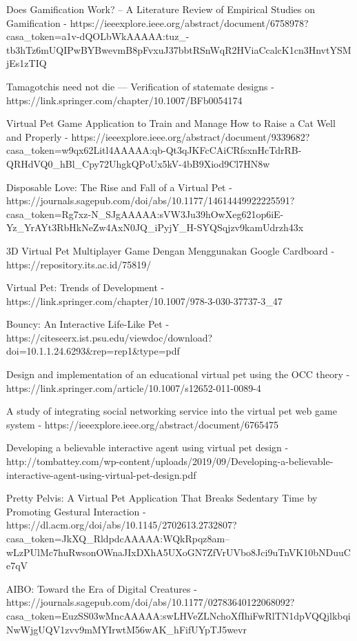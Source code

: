 Does Gamification Work? -- A Literature Review of Empirical Studies on Gamification - https://ieeexplore.ieee.org/abstract/document/6758978?casa_token=a1v-dQOLbWkAAAAA:tuz_-tb3hTz6mUQIPwBYBwevmB8pFvxuJ37bbtRSnWqR2HViaCcalcK1cn3HnvtYSMjEs1zTIQ



Tamagotchis need not die — Verification of statemate designs - https://link.springer.com/chapter/10.1007/BFb0054174


Virtual Pet Game Application to Train and Manage How to Raise a Cat Well and Properly - https://ieeexplore.ieee.org/abstract/document/9339682?casa_token=w9qx62Litl4AAAAA:qb-Qt3qJKFcCAiCRfsxnHcTdrRB-QRHdVQ0_hBl_Cpy72UhgkQPoUx5kV-4bB9Xiod9Cl7HN8w

Disposable Love: The Rise and Fall of a Virtual Pet - https://journals.sagepub.com/doi/abs/10.1177/14614449922225591?casa_token=Rg7xz-N_SJgAAAAA:sVW3Ju39hOwXeg621op6iE-Yz_YrAYt3RbHkNeZw4AxN0JQ_iPyjY_H-SYQSqjzv9kamUdrzh43x

3D Virtual Pet Multiplayer Game Dengan Menggunakan Google Cardboard - https://repository.its.ac.id/75819/

Virtual Pet: Trends of Development - https://link.springer.com/chapter/10.1007/978-3-030-37737-3_47

Bouncy: An Interactive Life-Like Pet - https://citeseerx.ist.psu.edu/viewdoc/download?doi=10.1.1.24.6293&rep=rep1&type=pdf

Design and implementation of an educational virtual pet using the OCC theory - https://link.springer.com/article/10.1007/s12652-011-0089-4

A study of integrating social networking service into the virtual pet web game system - https://ieeexplore.ieee.org/abstract/document/6765475

Developing a believable interactive agent using
virtual pet design - http://tombattey.com/wp-content/uploads/2019/09/Developing-a-believable-interactive-agent-using-virtual-pet-design.pdf

Pretty Pelvis: A Virtual Pet Application That Breaks Sedentary Time by Promoting Gestural Interaction - https://dl.acm.org/doi/abs/10.1145/2702613.2732807?casa_token=JkXQ_RldpdcAAAAA:WQkRpqz8am--wLzPUlMc7huRwsonOWnaJIxDXhA5UXoGN7ZfVrUVbo8Jci9uTnVK10bNDuuCe7qV

AIBO: Toward the Era of Digital Creatures - https://journals.sagepub.com/doi/abs/10.1177/02783640122068092?casa_token=EuzSS03wMncAAAAA:swLHVeZLNchoXfIhiFwRlTN1dpVQQjlkbqiNwWjgUQV1zvv9mMYIrwtM56wAK_hFifUYpTJ5wevr

